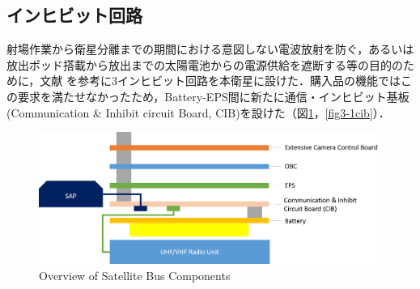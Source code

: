 \subsection{インヒビット回路}
\label{subsec;inhibit}

射場作業から衛星分離までの期間における意図しない電波放射を防ぐ，あるいは放出ポッド搭載から放出までの太陽電池からの電源供給を遮断する等の目的のために，文献 \cite{sat_safety}を参考に3インヒビット回路を本衛星に設けた．購入品の機能ではこの要求を満たせなかったため，Battery-EPS間に新たに通信・インヒビット基板(Communication \& Inhibit circuit Board, CIB)を設けた（図\ref{fig3-1cib_p}，\ref{fig3-1cib}）．

\begin{figure}[htbp]
	\centering
	\includegraphics[width=0.7\linewidth]{./03/fig/cib_position.png}
	\caption{Overview of Satellite Bus Components}
	\label{fig3-1cib_p}
\end{figure}


